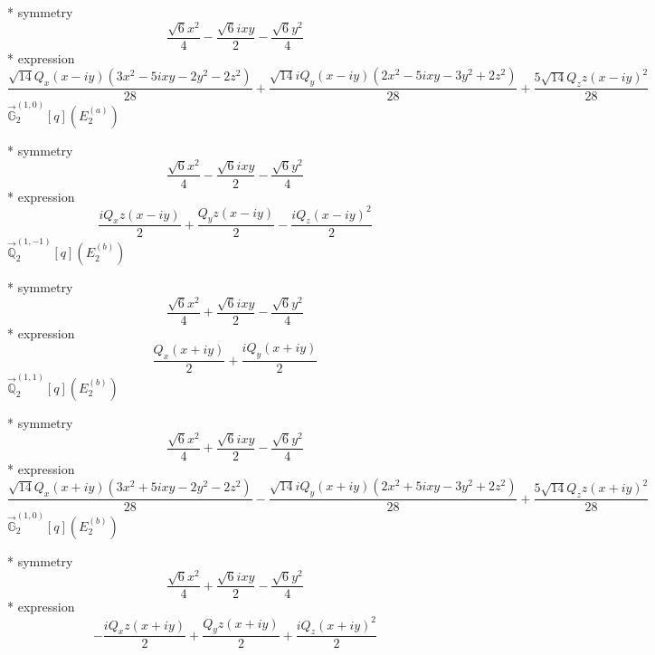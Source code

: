 \documentclass[fleqn,8pt]{jsarticle}
\begin{document}
\noindent\quad ** symmetry
\begin{dmath*}
\frac{\sqrt{6} x^{2}}{4} - \frac{\sqrt{6} i x y}{2} - \frac{\sqrt{6} y^{2}}{4}
\end{dmath*}
\noindent\quad ** expression
\begin{dmath*}
\frac{\sqrt{14} Q_{x} \left(x - i y\right) \left(3 x^{2} - 5 i x y - 2 y^{2} - 2 z^{2}\right)}{28} + \frac{\sqrt{14} i Q_{y} \left(x - i y\right) \left(2 x^{2} - 5 i x y - 3 y^{2} + 2 z^{2}\right)}{28} + \frac{5 \sqrt{14} Q_{z} z \left(x - i y\right)^{2}}{28}
\end{dmath*}
\noindent\quad $\vec{\mathbb{G}}_{2}^{(1,0)}[q](E_{2}^{(a)})$

\noindent\quad ** symmetry
\begin{dmath*}
\frac{\sqrt{6} x^{2}}{4} - \frac{\sqrt{6} i x y}{2} - \frac{\sqrt{6} y^{2}}{4}
\end{dmath*}
\noindent\quad ** expression
\begin{dmath*}
\frac{i Q_{x} z \left(x - i y\right)}{2} + \frac{Q_{y} z \left(x - i y\right)}{2} - \frac{i Q_{z} \left(x - i y\right)^{2}}{2}
\end{dmath*}
\noindent\quad $\vec{\mathbb{Q}}_{2}^{(1,-1)}[q](E_{2}^{(b)})$

\noindent\quad ** symmetry
\begin{dmath*}
\frac{\sqrt{6} x^{2}}{4} + \frac{\sqrt{6} i x y}{2} - \frac{\sqrt{6} y^{2}}{4}
\end{dmath*}
\noindent\quad ** expression
\begin{dmath*}
\frac{Q_{x} \left(x + i y\right)}{2} + \frac{i Q_{y} \left(x + i y\right)}{2}
\end{dmath*}
\noindent\quad $\vec{\mathbb{Q}}_{2}^{(1,1)}[q](E_{2}^{(b)})$

\noindent\quad ** symmetry
\begin{dmath*}
\frac{\sqrt{6} x^{2}}{4} + \frac{\sqrt{6} i x y}{2} - \frac{\sqrt{6} y^{2}}{4}
\end{dmath*}
\noindent\quad ** expression
\begin{dmath*}
\frac{\sqrt{14} Q_{x} \left(x + i y\right) \left(3 x^{2} + 5 i x y - 2 y^{2} - 2 z^{2}\right)}{28} - \frac{\sqrt{14} i Q_{y} \left(x + i y\right) \left(2 x^{2} + 5 i x y - 3 y^{2} + 2 z^{2}\right)}{28} + \frac{5 \sqrt{14} Q_{z} z \left(x + i y\right)^{2}}{28}
\end{dmath*}
\noindent\quad $\vec{\mathbb{G}}_{2}^{(1,0)}[q](E_{2}^{(b)})$

\noindent\quad ** symmetry
\begin{dmath*}
\frac{\sqrt{6} x^{2}}{4} + \frac{\sqrt{6} i x y}{2} - \frac{\sqrt{6} y^{2}}{4}
\end{dmath*}
\noindent\quad ** expression
\begin{dmath*}
- \frac{i Q_{x} z \left(x + i y\right)}{2} + \frac{Q_{y} z \left(x + i y\right)}{2} + \frac{i Q_{z} \left(x + i y\right)^{2}}{2}
\end{dmath*}
\end{document}
